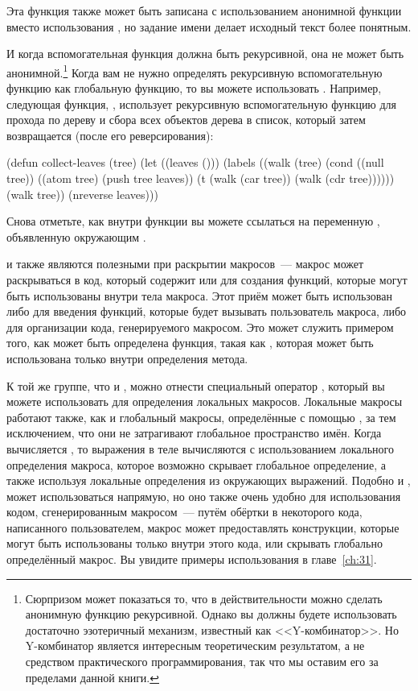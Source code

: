 Эта функция также может быть записана с использованием анонимной функции вместо
использования , но задание имени делает исходный текст более понятным.

И когда вспомогательная функция должна быть рекурсивной, она не может быть
анонимной.\footnote{Сюрпризом может показаться то, что в действительности можно сделать
  анонимную функцию рекурсивной.  Однако вы должны будете использовать достаточно
  эзотеричный механизм, известный как <<Y-комбинатор>>.  Но Y-комбинатор является интересным
  теоретическим результатом, а не средством практического программирования, так что мы
  оставим его за пределами данной книги.}  Когда вам не нужно определять рекурсивную
вспомогательную функцию как глобальную функцию, то вы можете использовать .
Например, следующая функция, , использует рекурсивную вспомогательную
функцию  для прохода по дереву и сбора всех объектов дерева в список, который
затем возвращается  (после его реверсирования):

\begin{myverb}
(defun collect-leaves (tree)
  (let ((leaves ()))
    (labels ((walk (tree)
               (cond
                 ((null tree))
                 ((atom tree) (push tree leaves))
                 (t (walk (car tree))
                    (walk (cdr tree))))))
      (walk tree))
    (nreverse leaves)))
\end{myverb}


Снова отметьте, как внутри функции  вы можете ссылаться на переменную
, объявленную окружающим .

 и  также являются полезными при раскрытии макросов~--- макрос
может раскрываться в код, который содержит  или  для создания
функций, которые могут быть использованы внутри тела макроса.  Этот приём может быть
использован либо для введения функций, которые будет вызывать пользователь макроса, либо
для организации кода, генерируемого макросом.  Это может служить примером того, как может
быть определена функция, такая как , которая может быть
использована только внутри определения метода.

К той же группе, что  и , можно отнести специальный оператор
, который вы можете использовать для определения локальных
макросов. Локальные макросы работают также, как и глобальный макросы, определённые с
помощью , за тем исключением, что они не затрагивают глобальное
пространство имён.  Когда вычисляется , то выражения в теле вычисляются с
использованием локального определения макроса, которое возможно скрывает глобальное
определение, а также используя локальные определения из окружающих выражений.  Подобно
 и ,  может использоваться напрямую, но оно также
очень удобно для использования кодом, сгенерированным макросом~--- путём обёртки в
 некоторого кода, написанного пользователем, макрос может предоставлять
конструкции, которые могут быть использованы только внутри этого кода, или скрывать
глобально определённый макрос.  Вы увидите примеры использования  в
главе~\ref{ch:31}.

